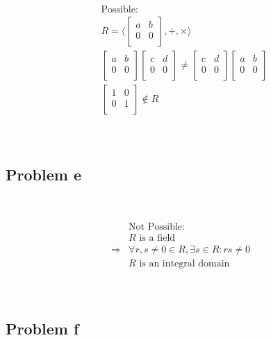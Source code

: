 \documentclass{article}
\begin{document}
\begin{align*}
    &\text{Possible}:\\
    &R=\langle \begin{bmatrix}
        a&b\\
        0&0\\
    \end{bmatrix} ,+,\times\rangle\\
    &\begin{bmatrix}
        a&b\\
        0&0\\
    \end{bmatrix}\begin{bmatrix}
        c&d\\
        0&0\\
    \end{bmatrix}\ne\begin{bmatrix}
        c&d\\
        0&0\\
    \end{bmatrix}\begin{bmatrix}
        a&b\\
        0&0\\
    \end{bmatrix}\\
    &\begin{bmatrix}
        1&0\\
        0&1\\
    \end{bmatrix}\notin R\\
\end{align*}

~

\subsection*{Problem e}

~

\begin{align*}
    &\text{Not Possible}:\\
    &R\text{ is a field}\\
    \Rightarrow&\forall r,s\ne0\in R,\exists s\in R:rs\ne0\\
    &R\text{ is an integral domain}\\
\end{align*}

~

\subsection*{Problem f}
\end{document}
